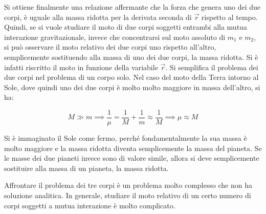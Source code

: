Si ottiene finalmente una relazione affermante che la forza che genera uno dei due corpi, è uguale alla massa ridotta per la derivata seconda di $\vec{r}$ rispetto al tempo. Quindi, se si vuole studiare il moto di due corpi soggetti entrambi alla mutua interazione gravitazionale, invece che concentrarsi sul moto assoluto di $m_1$ e $m_2$, si può osservare il moto relativo dei due corpi uno rispetto all'altro, semplicemente sostituendo alla massa di uno dei due corpi, la massa ridotta. Si è infatti riscritto il moto in funzione della variabile $\vec{r}$.  Si semplifica il problema dei due corpi nel problema di un corpo solo. Nel caso del moto della Terra intorno al Sole, dove quindi uno dei due corpi è molto molto maggiore in massa dell'altro, si ha:

\[
	M \gg m \implies \frac{1}{\mu}=\frac{1}{M}+\frac{1}{m}  \approx \frac{1}{M} \implies \mu \approx M
\]

Si è immaginato il Sole come fermo, perché fondamentalmente la sua massa è molto maggiore e la massa ridotta diventa semplicemente la massa del pianeta. Se le masse dei due pianeti invece sono di valore simile, allora si deve semplicemente sostituire alla massa di un pianeta, la massa ridotta.

Affrontare il problema dei tre corpi è un problema molto complesso che non ha soluzione analitica. In generale, studiare il moto relativo di un certo numero di corpi soggetti a mutua interazione è molto complicato.